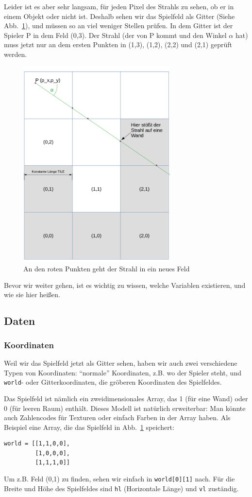 \documentclass[a4paper,12pt]{report}
\begin{document}
Leider ist es aber sehr langsam, f\"ur jeden Pixel des Strahls zu sehen, ob er in einem Objekt oder nicht ist. Deshalb sehen wir das Spielfeld als Gitter (Siehe Abb.~\ref{fig:grid}), und m\"ussen so an viel weniger Stellen pr\"ufen. In dem Gitter ist der Spieler P in dem Feld (0,3). Der Strahl (der von P kommt und den Winkel $\alpha$ hat) muss jetzt nur an dem ersten Punkten in (1,3), (1,2), (2,2) und (2,1) gepr\"uft werden.
\begin{figure}[htbp]
        \centering
        \includegraphics[width=8cm]{grid.png} 
        \caption{An den roten Punkten geht der Strahl in ein neues Feld}
        \label{fig:grid}
\end{figure}

Bevor wir weiter gehen, ist es wichtig zu wissen, welche Variablen existieren, und wie sie hier hei\ss en.

\subsection{Daten}
\subsubsection{Koordinaten}
Weil wir das Spielfeld jetzt als Gitter sehen, haben wir auch zwei verschiedene Typen von Koordinaten: ``normale'' Koordinaten, z.B. wo der Spieler steht, und \texttt{world}- oder Gitterkoordinaten, die gr\"oberen Koordinaten des Spielfeldes.

Das Spielfeld ist n\"amlich ein zweidimensionales Array, das 1 (f\"ur eine Wand) oder 0 (f\"ur leeren Raum) enth\"alt. Dieses Modell ist nat\"urlich erweiterbar: Man k\"onnte auch Zahlencodes f\"ur Texturen oder einfach Farben in der Array haben. Als Beispiel eine Array, die das Spielfeld in Abb.~\ref{fig:grid} speichert:
\begin{Verbatim}[baselinestretch=1.0, xleftmargin=1cm]
world = [[1,1,0,0],
         [1,0,0,0],
         [1,1,1,0]]
\end{Verbatim}
Um z.B. Feld (0,1) zu finden, sehen wir einfach in \texttt{world[0][1]} nach. F\"ur die Breite und H\"ohe des Spielfeldes sind \texttt{hl} (Horizontale L\"ange) und \texttt{vl} zust\"andig. 
\end{document}
